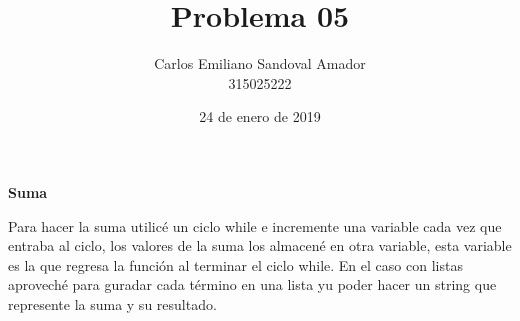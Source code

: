 \documentclass[letterpaper, 12pt, oneside]{article}%
\title{Problema 05}
\author{Carlos Emiliano Sandoval Amador \\ 315025222}
\date{24 de enero de 2019}
\begin{document}
	\maketitle
	\begin{center}
		\textbf{\large Suma}
	\end{center}
	Para hacer la suma utilicé un ciclo while e incremente una variable cada vez que entraba al ciclo, los valores de la suma los almacené en otra variable, esta variable es la que regresa la función al terminar el ciclo while. En el caso con listas aproveché para guradar cada término en una lista yu poder hacer un string que represente la suma y su resultado.
\end{document}

